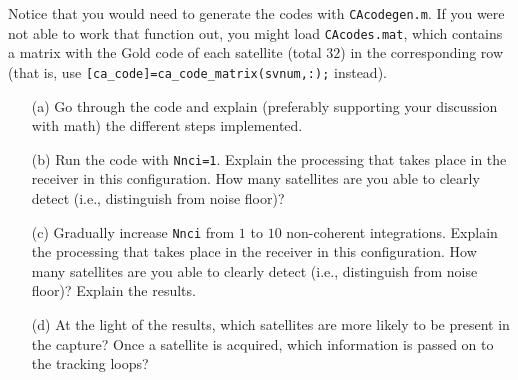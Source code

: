 \documentclass[11pt]{article}
\begin{document}
Notice that you would need to generate the codes with \verb|CAcodegen.m|. If you were not able to work that function out, you might load \verb|CAcodes.mat|, which contains a matrix with the Gold code of each satellite (total $32$) in the corresponding row (that is, use \verb|[ca_code]=ca_code_matrix(svnum,:);| instead).


\begin{enumerate}
\item[(a)] Go through the code and explain (preferably supporting your discussion with math) the different steps implemented. 
\item[(b)] Run the code with \verb|Nnci=1|. Explain the processing that takes place in the receiver in this configuration. How many satellites are you able to clearly detect (i.e., distinguish from noise floor)? 
\item[(c)] Gradually increase \verb|Nnci| from $1$ to $10$ non-coherent integrations. Explain the processing that takes place in the receiver in this configuration. How many satellites are you able to clearly detect (i.e., distinguish from noise floor)? Explain the results. 
\item[(d)] At the light of the results, which satellites are more likely to be present in the capture? Once a satellite is acquired, which information is passed on to the tracking loops?
\end{enumerate}
\end{document}
